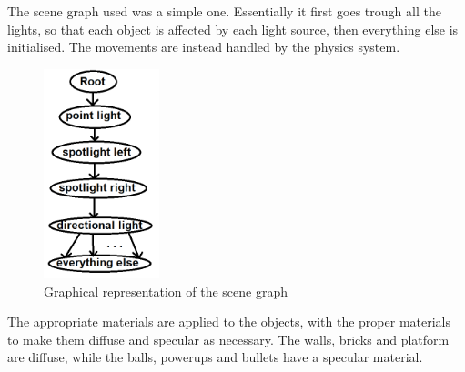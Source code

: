 The scene graph used was a simple one. Essentially it first goes trough all the lights, so that each object is affected by each light source, then everything else is initialised. The movements are instead handled by the physics system.
\begin{figure}[H]
	\centering
	\includegraphics[width=0.3\textwidth]{Images/SceneGraph.png}
	\caption{Graphical representation of the scene graph}
\end{figure}

The appropriate materials are applied to the objects, with the proper materials to make them diffuse and specular as necessary. The walls, bricks and platform are diffuse, while the balls, powerups and bullets have a specular material.
